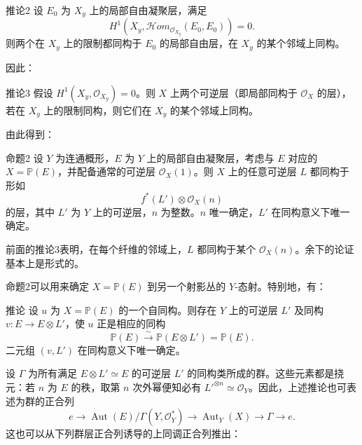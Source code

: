 \begin{statement}{推论2}
设 $E_0$ 为 $X_y$ 上的局部自由凝聚层，满足
\[
H^1(X_y,\mathcal H om_{\mathcal O_{X_y}}(E_0,E_0))=0.
\]
则两个在 $X_y$ 上的限制都同构于 $E_0$ 的局部自由层，在 $X_y$ 的某个邻域上同构。
\end{statement}
因此：
\begin{statement}{推论3}
假设 $H^1(X_y,\mathcal O_{X_y})=0$。则 $X$ 上两个可逆层（即局部同构于 $\mathcal O_X$ 的层），若在 $X_y$ 上的限制同构，则它们在 $X_y$ 的某个邻域上同构。
\end{statement}
由此得到：
\begin{statement}{命题2}
设 $Y$ 为连通概形，$E$ 为 $Y$ 上的局部自由凝聚层，考虑与 $E$ 对应的 $X=\mathbb P(E)$，并配备通常的可逆层 $\mathcal O_X(1)$。则 $X$ 上的任意可逆层 $L$ 都同构于形如
\[
f^*(L')\otimes\mathcal O_X(n)
\]
的层，其中 $L'$ 为 $Y$ 上的可逆层，$n$ 为整数。$n$ 唯一确定，$L'$ 在同构意义下唯一确定。
\end{statement}
前面的推论3表明，在每个纤维的邻域上，$L$ 都同构于某个 $\mathcal O_X(n)$。余下的论证基本上是形式的。

命题2可以用来确定 $X=\mathbb P(E)$ 到另一个射影丛的 $Y$-态射。特别地，有：
\begin{statement}{推论}
设 $u$ 为 $X=\mathbb P(E)$ 的一个自同构。则存在 $Y$ 上的可逆层 $L'$ 及同构 $v:E\to E\otimes L'$，使 $u$ 正是相应的同构
\[
\mathbb P(E)\xrightarrow{\sim}\mathbb P(E\otimes L')=\mathbb P(E).
\]
二元组 $(v,L')$ 在同构意义下唯一确定。
\end{statement}
设 $\Gamma$ 为所有满足 $E\otimes L'\simeq E$ 的可逆层 $L'$ 的同构类所成的群。这些元素都是挠元：若 $n$ 为 $E$ 的秩，取第 $n$ 次外幂便知必有 $L'^{\otimes n}\simeq\mathcal O_Y$。因此，上述推论也可表述为群的正合列
\[
e\longrightarrow\operatorname{Aut}(E)/\Gamma(Y,\mathcal O_Y^*)
\longrightarrow\operatorname{Aut}_Y(X)\longrightarrow\Gamma\longrightarrow e.
\]
这也可以从下列群层正合列诱导的上同调正合列推出：

